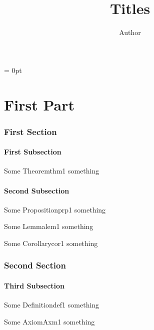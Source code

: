 \documentclass[a4paper, 11pt]{jlreq}
\begin{document}
\title{ Titles }
\author{ Author }
\date{\empty}
\maketitle

\parindent = 0pt
\allowdisplaybreaks[1]

\newpage

\part{First Part}

\section{First Section}

\subsection{First Subsection}

\begin{userThm}{Some Theorem}{thm1}
    something
\end{userThm}

\subsection{Second Subsection}

\begin{userPrp}{Some Proposition}{prp1}
    something
\end{userPrp}

\begin{userLem}{Some Lemma}{lem1}
    something
\end{userLem}

\begin{userCor}{Some Corollary}{cor1}
    something
\end{userCor}

\section{Second Section}

\subsection{Third Subsection}

\begin{userDef}{Some Definition}{def1}
    something
\end{userDef}

\begin{userAxm}{Some Axiom}{Axm1}
    something
\end{userAxm}


\end{document}
